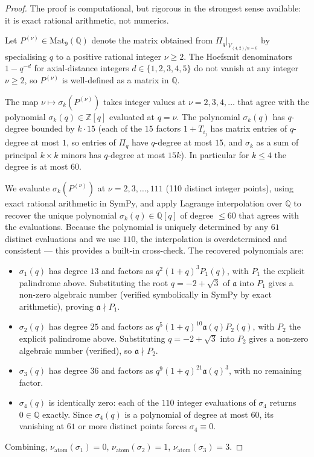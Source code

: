 \documentclass[11pt]{article}
\theoremstyle{plain}
\theoremstyle{definition}
\theoremstyle{remark}
\newcommand{\Z}{\mathbb{Z}}
\newcommand{\Q}{\mathbb{Q}}
\newcommand{\Pibs}{\Pi_q}
\newcommand{\val}{\nu_{\mathrm{atom}}}
\newcommand{\atom}{\mathfrak{a}}
\begin{document}
\begin{proof}
The proof is computational, but rigorous in the strongest sense available: it is
exact rational arithmetic, not numerics.

Let $P^{(\nu)} \in \mathrm{Mat}_9(\Q)$ denote the matrix obtained from
$\Pibs|_{V_{(4,2)/n=6}}$ by specialising $q$ to a positive rational integer
$\nu \geq 2$.  The Hoefsmit denominators $1 - q^{-d}$ for axial-distance integers
$d \in \{1,2,3,4,5\}$ do not vanish at any integer $\nu \geq 2$, so $P^{(\nu)}$ is
well-defined as a matrix in $\Q$.

The map $\nu \mapsto \sigma_k(P^{(\nu)})$ takes integer values at $\nu = 2, 3, 4,
\ldots$ that agree with the polynomial $\sigma_k(q) \in \Z[q]$ evaluated at $q = \nu$.
The polynomial $\sigma_k(q)$ has $q$-degree bounded by $k \cdot 15$ (each of the $15$
factors $1+T_{i_j}$ has matrix entries of $q$-degree at most $1$, so entries of $\Pibs$
have $q$-degree at most $15$, and $\sigma_k$ as a sum of principal $k\times k$ minors
has $q$-degree at most $15k$).  In particular for $k \leq 4$ the degree is at most
$60$.

We evaluate $\sigma_k(P^{(\nu)})$ at $\nu = 2, 3, \ldots, 111$ (110 distinct integer
points), using exact rational arithmetic in SymPy, and apply Lagrange interpolation
over $\Q$ to recover the unique polynomial $\sigma_k(q) \in \Q[q]$ of degree $\leq
60$ that agrees with the evaluations.  Because the polynomial is uniquely
determined by any $61$ distinct evaluations and we use $110$, the interpolation is
overdetermined and consistent --- this provides a built-in cross-check.  The
recovered polynomials are:
\begin{itemize}
\item $\sigma_1(q)$ has degree $13$ and factors as $q^2(1+q)^3 P_1(q)$, with $P_1$
  the explicit palindrome above.  Substituting the root $q = -2 + \sqrt{3}$ of $\atom$
  into $P_1$ gives a non-zero algebraic number (verified symbolically in SymPy by
  exact arithmetic), proving $\atom \nmid P_1$.
\item $\sigma_2(q)$ has degree $25$ and factors as $q^5(1+q)^{10}\atom(q) P_2(q)$,
  with $P_2$ the explicit palindrome above.  Substituting $q = -2 + \sqrt{3}$ into
  $P_2$ gives a non-zero algebraic number (verified), so $\atom \nmid P_2$.
\item $\sigma_3(q)$ has degree $36$ and factors as $q^9(1+q)^{21}\atom(q)^3$, with
  no remaining factor.
\item $\sigma_4(q)$ is identically zero: each of the $110$ integer evaluations of
  $\sigma_4$ returns $0 \in \Q$ exactly.  Since $\sigma_4(q)$ is a polynomial of
  degree at most $60$, its vanishing at $61$ or more distinct points forces
  $\sigma_4 \equiv 0$.
\end{itemize}
Combining, $\val(\sigma_1) = 0$, $\val(\sigma_2) = 1$, $\val(\sigma_3) = 3$.
\end{proof}
\end{document}
